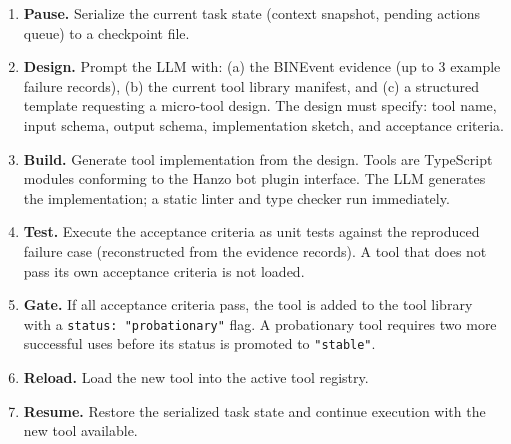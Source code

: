 \begin{enumerate}[leftmargin=1.5em]
    \item \textbf{Pause.} Serialize the current task state (context snapshot,
          pending actions queue) to a checkpoint file.

    \item \textbf{Design.} Prompt the LLM with: (a) the BINEvent evidence
          (up to 3 example failure records), (b) the current tool library
          manifest, and (c) a structured template requesting a micro-tool
          design. The design must specify: tool name, input schema, output
          schema, implementation sketch, and acceptance criteria.

    \item \textbf{Build.} Generate tool implementation from the design. Tools
          are TypeScript modules conforming to the Hanzo bot plugin interface.
          The LLM generates the implementation; a static linter and type
          checker run immediately.

    \item \textbf{Test.} Execute the acceptance criteria as unit tests against
          the reproduced failure case (reconstructed from the evidence records).
          A tool that does not pass its own acceptance criteria is not loaded.

    \item \textbf{Gate.} If all acceptance criteria pass, the tool is added to
          the tool library with a \texttt{status: "probationary"} flag. A
          probationary tool requires two more successful uses before its status
          is promoted to \texttt{"stable"}.

    \item \textbf{Reload.} Load the new tool into the active tool registry.

    \item \textbf{Resume.} Restore the serialized task state and continue
          execution with the new tool available.
\end{enumerate}

